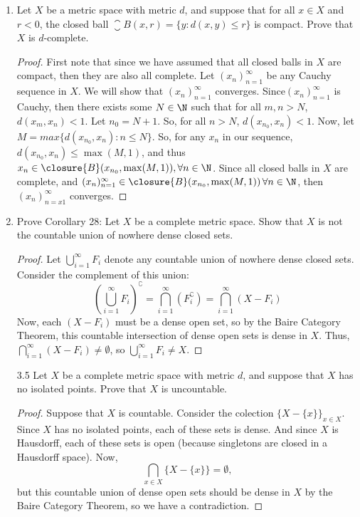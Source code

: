 \documentclass[letterpaper]{article}
\begin{document}
\begin{enumerate}
\item Let $X$ be a metric space with metric $d$, and suppose that for all $x\in X$ and $r<0$, the closed ball $\closure{B}(x,r) = \{y:d(x,y)\leq r\}$ is compact. Prove that $X$ is $d$-complete. 
\begin{proof}
First note that since we have assumed that all closed balls in $X$ are compact, then they are also all complete. Let $(x_n)_{n=1}^\infty$ be any Cauchy sequence in $X$. We will show that $(x_n)_{n=1}^\infty$ converges. Since$(x_n)_{n=1}^\infty$ is Cauchy, then there exists some $N\in\N$ such that for all $m,n>N$, $d(x_m,x_n)<1$. Let $n_0=N+1$. So, for all $n>N$, $d(x_{n_0},x_n)<1$. Now, let $M=max\{d(x_{n_0},x_n) : n \leq N\}$. So, for any $x_n$ in our sequence, $d(x_{n_0},x_n)\leq \max(M,1)$, and thus $x_n\in \closure{B}(x_{n_0},\max(M,1)), \forall n\in\N$. Since all closed balls in $X$ are complete, and $(x_n)_{n=1}^\infty\in\closure{B}(x_{n_0},\max(M,1))\,  \forall n\in\N$, then $(x_n)_{n=x1}^\infty$ converges. 
\end{proof}

\item Prove Corollary 28: Let $X$ be a complete metric space. Show that $X$ is not the countable union of nowhere dense closed sets.
\begin{proof}
Let $\bigcup_{i=1}^\infty F_i$ denote any countable union of nowhere dense closed sets. Consider the complement of this union:
$$\left(\bigcup_{i=1}^\infty F_i\right)^\complement = \bigcap_{i=1}^\infty \left(F_i^\complement\right) = \bigcap_{i=1}^\infty \left(X - F_i\right)$$
Now, each $(X-F_i)$ must be a dense open set, so by the Baire Category Theorem, this countable intersection of dense open sets is dense in $X$. Thus, $\bigcap_{i=1}^\infty \left(X - F_i\right)\neq\emptyset$, so $\bigcup_{i=1}^\infty F_i\neq X$.
\end{proof}

\item[3.5] Let $X$ be a complete metric space with metric $d$, and suppose that $X$ has no isolated points. Prove that $X$ is uncountable.
\begin{proof}
Suppose that $X$ is countable. Consider the colection $\{X-\{x\}\}_{x\in X}$. Since $X$ has no isolated points, each of these sets is dense. And since $X$ is Hausdorff, each of these sets is open (because singletons are closed in a Hausdorff space). Now, 
$$\bigcap_{x\in X}\{X-\{x\}\}=\emptyset,$$
but this countable union of dense open sets should be dense in $X$ by the Baire Category Theorem, so we have a contradiction. 
\end{proof}
\end{enumerate}
\end{document}

